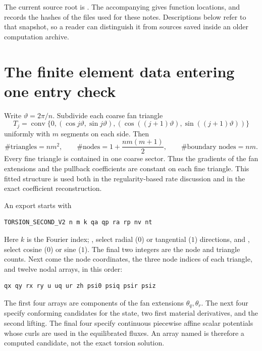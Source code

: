 The current source root is . The accompanying
 gives function locations, and 
records the hashes of the files used for these notes. Descriptions below
refer to that snapshot, so a reader can distinguish it from sources saved
inside an older computation archive.

\section{The finite element data entering one entry check}
Write $\vartheta=2\pi/n$. Subdivide each coarse fan triangle
\[
 T_j=\operatorname{conv}\{0,(\cos j\vartheta,\sin j\vartheta),
                  (\cos((j+1)\vartheta),\sin((j+1)\vartheta))\}
\]
uniformly with $m$ segments on each side. Then
\[
 \#\text{triangles}=nm^2,\qquad
 \#\text{nodes}=1+\frac{nm(m+1)}2,\qquad
 \#\text{boundary nodes}=nm.
\]
Every fine triangle is contained in one coarse sector. Thus the gradients
of the fan extensions and the pullback coefficients are constant on each
fine triangle. This fitted structure is used both in the regularity-based
rate discussion and in the exact coefficient reconstruction.

An export starts with
\begin{lstlisting}
TORSION_SECOND_V2 n m k qa qp ra rp nv nt
\end{lstlisting}
Here $k$ is the Fourier index; ,  select radial ($0$) or
tangential ($1$) directions, and ,  select cosine ($0$)
or sine ($1$). The final two integers are the node and triangle counts.
Next come the node coordinates, the three node indices of each triangle,
and twelve nodal arrays, in this order:
\begin{lstlisting}
qx qy rx ry u uq ur zh psi0 psiq psir psiz
\end{lstlisting}
The first four arrays are components of the fan extensions
$\theta_q,\theta_r$. The next four specify conforming candidates for the
state, two first material derivatives, and the second lifting. The final
four specify continuous piecewise affine scalar potentials whose curls
are used in the equilibrated fluxes. An array named  is therefore
a computed candidate, not the exact torsion solution.


